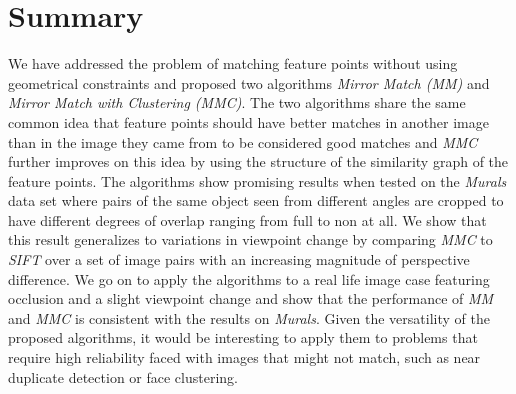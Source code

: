 \documentclass[conference]{IEEEtran}
\begin{document}
\section{Summary}
We have addressed the problem of matching feature points without using 
geometrical constraints and proposed two algorithms \emph{Mirror Match 
(MM)} and \emph{Mirror Match with Clustering (MMC)}.  The two algorithms 
share the same common idea that feature points should have better 
matches in another image than in the image they came from to be 
considered good matches and \emph{MMC} further improves on this idea by 
using the structure of the similarity graph of the feature points. The 
algorithms show promising results when tested on the \emph{Murals} data 
set where pairs of the same object seen from different angles are 
cropped to have different degrees of overlap ranging from full to non at 
all. We show that this result generalizes to variations in viewpoint 
change by comparing \emph{MMC} to \emph{SIFT} over a set of image pairs 
with an increasing magnitude of perspective difference. We go on to 
apply the algorithms to a real life image case featuring occlusion and a 
slight viewpoint change and show that the performance of \emph{MM} and 
\emph{MMC} is consistent with the results on \emph{Murals}. Given the 
versatility of the proposed algorithms, it would be interesting to apply 
them to problems that require high reliability faced with images that 
might not match, such as near duplicate detection or face clustering.
%


\end{document}
